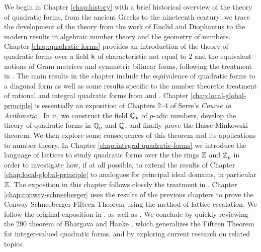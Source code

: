 We begin in Chapter \ref{chap:history} with a brief historical overview of the
theory of quadratic forms, from the ancient Greeks to the nineteenth century; we
trace the development of the theory from the work of Euclid and Diophantus to
the modern results in algebraic number theory and the geometry of numbers.
Chapter \ref{chap:quadratic-forms} provides an introduction of the theory of
quadratic forms over a field \(\mathsf{k}\) of characteristic not equal to \(2\) and
the equivalent notions of Gram matrices and symmetric bilinear forms, following
the treatment in \cite{lam1973quadratic}. The main results in the chapter
include the equivalence of quadratic forms to a diagonal form as well as some
results specific to the number theoretic treatment of rational and integral
quadratic forms from \cite{cassels2008rational} and \cite{jones1950arithmetic}.
Chapter \ref{chap:local-global-principle} is essentially an exposition of
Chapters 2--4 of Serre's \emph{Course in Arithmetic} \cite{serre2012course}. In
it, we construct the field \(\mathbb{Q}_p\) of \(p\)-adic numbers, develop the
theory of quadratic forms in \(\mathbb{Q}_p\) and \(\mathbb{Q}\), and finally
prove the Hasse-Minkowski theorem. We then explore some consequences of this
theorem and its applications to number theory. In Chapter
\ref{chap:integral-quadratic-forms} we introduce the language of lattices to
study quadratic forms over the the rings \(\mathbb{Z}\) and \(\mathbb{Z}_p\) in
order to investigate how, if at all possible, to extend the results of Chapter
\ref{chap:local-global-principle} to analogues for principal ideal domains, in
particular \(\mathbb{Z}\). The exposition in this chapter follows closely the
treatment in \cite{cassels2008rational,gerstein2008basic,jones1950arithmetic}.
Chapter \ref{chap:conway-schneeberger} uses the results of the previous chapters
to prove the Conway-Schneeberger Fifteen Theorem using the method of lattice
escalation. We follow the original exposition in \cite{bhargava2000conway}, as
well as \cite{moon2008universal}. We conclude by quickly reviewing the \(290\)
theorem of Bhargava and Hanke \cite{bhargava2005universal}, which generalizes
the Fifteen Theorem for integer-valued quadratic forms, and by exploring current
research on related topics.